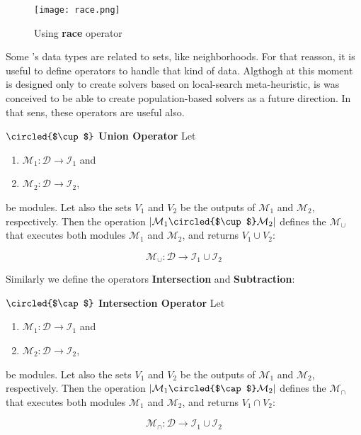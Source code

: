 \begin{figure}[h]
	\centering	
	\texttt{[image: race.png]}
	\caption{Using {\bf race} operator}\label{fig:race_example}
\end{figure}

\separation

Some \posl's data types are related to sets, like neighborhoods. For that reasson, it is useful to define operators to handle that kind of data. Algthogh at this moment \posl{} is designed only to create solvers based on local-search meta-heuristic, is was conceived to be able to create population-based solvers as a future direction. In that sens, these operators are useful also.

\begin{definition}\label{op:union}
$\circled{$\cup$}$ {\bf Union Operator} Let 
\begin{enumerate}%
	\item $\mathcal{M}_1 : \mathcal{D} \rightarrow \mathcal{I}_1$ and  
	\item $\mathcal{M}_2 : \mathcal{D} \rightarrow \mathcal{I}_2$,
\end{enumerate}%
be modules. %
Let also the sets $V_1$ and $V_2$ be the outputs of $\mathcal{M}_1$ and $\mathcal{M}_2$, respectively. Then the operation $\left|\mathcal{M}_1\circled{$\cup$}\mathcal{M}_2\right|$ defines the \cm{} $\mathcal{M}_{\cup}$ that executes both modules $\mathcal{M}_1$ and $\mathcal{M}_2$, and returns $V_1\cup V_2$:

\[
\mathcal{M}_{\cup}:\mathcal{D} \rightarrow \mathcal{I}_1 \cup \mathcal{I}_2
\]
\end{definition}

\separation

Similarly we define the operators \textbf{Intersection} and \textbf{Subtraction}:

\begin{definition}\label{op:intersec}
$\circled{$\cap$}$ {\bf Intersection Operator} Let 
\begin{enumerate}%
	\item $\mathcal{M}_1 : \mathcal{D} \rightarrow \mathcal{I}_1$ and  
	\item $\mathcal{M}_2 : \mathcal{D} \rightarrow \mathcal{I}_2$,
\end{enumerate}%
be modules. %
Let also the sets $V_1$ and $V_2$ be the outputs of $\mathcal{M}_1$ and $\mathcal{M}_2$, respectively. Then the operation $\left|\mathcal{M}_1\circled{$\cap$}\mathcal{M}_2\right|$ defines the \cm{} $\mathcal{M}_{\cap}$ that executes both modules $\mathcal{M}_1$ and $\mathcal{M}_2$, and returns $V_1\cap V_2$:

\[
\mathcal{M}_{\cap}:\mathcal{D} \rightarrow \mathcal{I}_1 \cup \mathcal{I}_2
\]
\end{definition}

